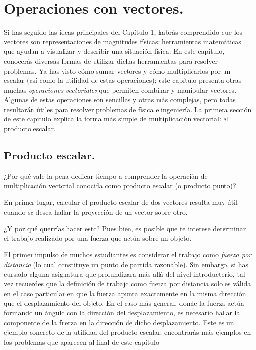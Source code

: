 \documentclass[hidelinks,12pt]{article}
\begin{document}
\section{Operaciones con vectores.}

Si has seguido las ideas principales del Capítulo 1, habrás comprendido que los vectores son representaciones de magnitudes físicas: herramientas matemáticas que ayudan a visualizar y describir una situación física. En este capítulo, conocerás diversas formas de utilizar dichas herramientas para resolver problemas. Ya has visto cómo sumar vectores y cómo multiplicarlos por un escalar (así como la utilidad de estas operaciones); este capítulo presenta otras muchas \textit{operaciones vectoriales} que permiten combinar y manipular vectores. Algunas de estas operaciones son sencillas y otras más complejas, pero todas resultarán útiles para resolver problemas de física e ingeniería. La primera sección de este capítulo explica la forma más simple de multiplicación vectorial: el producto escalar.

\subsection{Producto escalar.}

¿Por qué vale la pena dedicar tiempo a comprender la operación de multiplicación vectorial conocida como producto escalar (o producto punto)? 
\par
En primer lugar, calcular el producto escalar de dos vectores resulta muy útil cuando se desea hallar la proyección de un vector sobre otro.
\par
¿Y por qué querrías hacer esto? Pues bien, es posible que te interese determinar el trabajo realizado por una fuerza que actúa sobre un objeto.
\par
El primer impulso de muchos estudiantes es considerar el trabajo como \textit{fuerza por distancia} (lo cual constituye un punto de partida razonable). Sin embargo, si has cursado alguna asignatura que profundizara más allá del nivel introductorio, tal vez recuerdes que la definición de trabajo como fuerza por distancia solo es válida en el caso particular en que la fuerza apunta exactamente en la misma dirección que el desplazamiento del objeto. En el caso más general, donde la fuerza actúa formando un ángulo con la dirección del desplazamiento, es necesario hallar la componente de la fuerza en la dirección de dicho desplazamiento. Este es un ejemplo concreto de la utilidad del producto escalar; encontrarás más ejemplos en los problemas que aparecen al final de este capítulo.

\end{document}
